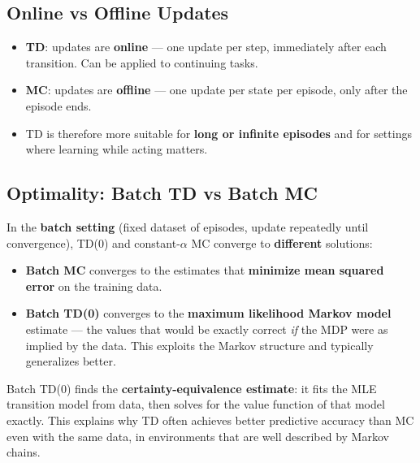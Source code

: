 \documentclass[11pt,a4paper]{article}
\theoremstyle{definition}
\theoremstyle{plain}
\theoremstyle{remark}
\begin{document}
\subsection{Online vs Offline Updates}

\begin{itemize}
    \item \textbf{TD}: updates are \textbf{online} — one update per step, immediately after each transition. Can be applied to continuing tasks.
    \item \textbf{MC}: updates are \textbf{offline} — one update per state per episode, only after the episode ends.
    \item TD is therefore more suitable for \textbf{long or infinite episodes} and for settings where learning while acting matters.
\end{itemize}

\subsection{Optimality: Batch TD vs Batch MC}

In the \textbf{batch setting} (fixed dataset of episodes, update repeatedly until convergence), TD(0) and constant-$\alpha$ MC converge to \textbf{different} solutions:

\begin{itemize}
    \item \textbf{Batch MC} converges to the estimates that \textbf{minimize mean squared error} on the training data.
    \item \textbf{Batch TD(0)} converges to the \textbf{maximum likelihood Markov model} estimate — the values that would be exactly correct \textit{if} the MDP were as implied by the data. This exploits the Markov structure and typically generalizes better.
\end{itemize}

\begin{tcolorbox}[colback=blue!5!white, colframe=blue!60!black, title={\textbf{Certainty-Equivalence Estimate}}]
Batch TD(0) finds the \textbf{certainty-equivalence estimate}: it fits the MLE transition model from data, then solves for the value function of that model exactly. This explains why TD often achieves better predictive accuracy than MC even with the same data, in environments that are well described by Markov chains.
\end{tcolorbox}

\end{document}
